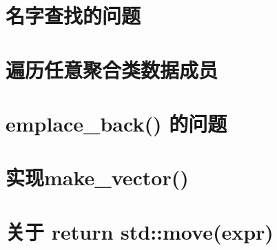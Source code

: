\documentclass[11pt,fancyhdr]{ctexart}
\begin{document}
\section{名字查找的问题}


\section{遍历任意聚合类数据成员}


\section{emplace\_back() 的问题}


\section{实现make\_vector()}


\section{关于 return std::move(expr)}

\end{document}
